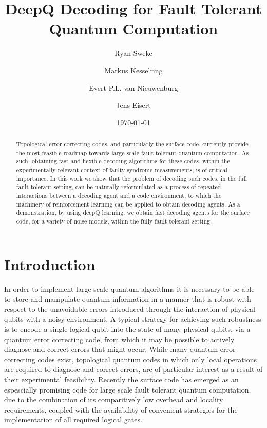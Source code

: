 \documentclass[onecolumn,preprintnumbers,amsmath,amssymb,notitlepage,nofootinbib,longbibliography,superscriptaddress]{revtex4-1}
\begin{document}
\title{DeepQ Decoding for Fault Tolerant Quantum Computation}

\author{Ryan Sweke}
\author{Markus Kesselring}
\author{Evert P.L. van Nieuwenburg}
\author{Jens Eisert}


\date{\today}


\begin{abstract}
Topological error correcting codes, and particularly the surface code, currently provide the most feasible roadmap towards large-scale fault tolerant quantum computation. As such, obtaining fast and flexible decoding algorithms for these codes, within the experimentally relevant context of faulty syndrome measurements, is of critical importance. In this work we show that the problem of decoding such codes, in the full fault tolerant setting, can be naturally reformulated as a process of repeated interactions between a decoding agent and a code environment, to which the machinery of reinforcement learning can be applied to obtain decoding agents. As a demonstration, by using deepQ learning, we obtain fast decoding agents for the surface code, for a variety of noise-models, within the fully fault tolerant setting.
\end{abstract}

\maketitle
 
 
\section{Introduction}\label{s:introduction}

    In order to implement large scale quantum algorithms it is necessary to be able to store and manipulate quantum information in a manner that is robust with respect to the unavoidable errors introduced through the interaction of physical qubits with a noisy environment. A typical strategy for achieving such robustness is to encode a single logical qubit into the state of many physical qubits, via a quantum error correcting code, from which it may be possible to actively diagnose and correct errors that might occur. While many quantum error correcting codes exist, topological quantum codes in which only local operations are required to diagnose and correct errors, are of particular interest as a result of their experimental feasibility. Recently the surface code has emerged as an espescially promising code for large scale fault tolerant quantum computation, due to the combination of its comparitively low overhead and locality requirements, coupled with the availability of convenient strategies for the implementation of all required logical gates.
\end{document}
